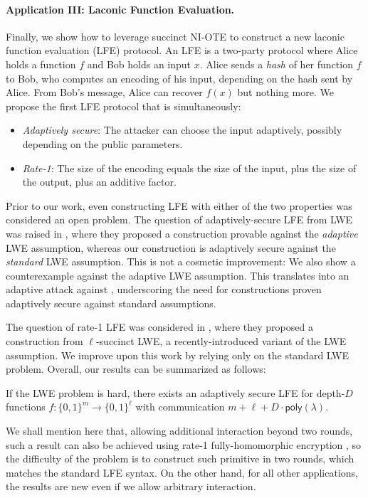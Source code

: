 \documentclass{theoretics}
\newcommand{\poly}{\mathsf{poly}}
\renewcommand{\sec}{\ensuremath{\lambda}}
\begin{document}
\paragraph{Application III: Laconic Function Evaluation.}
Finally, we show how to leverage succinct NI-OTE to construct a new laconic function evaluation (LFE) \cite{FOCS:QuaWeeWic18} protocol. {An LFE is a two-party protocol where Alice holds a function $f$ and Bob holds an input $x$. Alice sends a \emph{hash} of her function $f$ to Bob, who computes an encoding of his input, depending on the hash sent by Alice. From Bob's message, Alice can recover $f(x)$ but nothing more. We propose the first LFE protocol that is} simultaneously:
\begin{itemize}
    \item \emph{Adaptively secure}: The attacker can choose the input adaptively, possibly depending on the public parameters.
    \item \emph{Rate-1}: The size of the encoding equals the size of the input, plus the size of the output, plus an additive factor.
\end{itemize}
Prior to our work, even constructing LFE with either of the two properties was considered an open problem. 
The question of adaptively-secure LFE from LWE was raised in \cite{FOCS:QuaWeeWic18}, where they proposed a construction provable against the \emph{adaptive} LWE assumption, whereas our construction is adaptively secure against the \emph{standard} LWE assumption. {This is not a cosmetic improvement: We also show a counterexample against the adaptive LWE assumption. This translates into an adaptive attack against \cite{FOCS:QuaWeeWic18}, underscoring the need for constructions proven adaptively secure against standard assumptions.}

The question of rate-1 LFE was considered in \cite{C:Wee24}, where they proposed a construction from $\ell$-succinct LWE, a recently-introduced variant of the LWE assumption. We improve upon this work by relying only on the standard LWE problem. Overall, our results can be summarized as follows:
\begin{theorem}[Informal]
     If the LWE problem is hard, there exists an adaptively secure LFE for depth-$D$ functions $f:\{0, 1\}^m\rightarrow\{0, 1\}^\ell$ with communication $m+\ell+ D\cdot \poly(\sec)$.
\end{theorem}
{We shall mention here that, allowing additional interaction beyond two rounds, such a result can also be achieved using rate-1 fully-homomorphic encryption \cite{TCC:BDGM19}, so the difficulty of the problem is to construct such primitive in two rounds, which matches the standard LFE syntax. On the other hand, for all other applications, the results are new even if we allow arbitrary interaction.}
\end{document}
